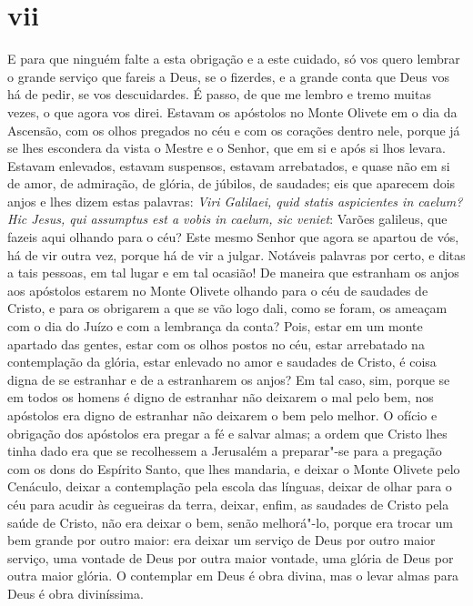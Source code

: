 \section*{vii}

E para que ninguém falte a esta obrigação e a este cuidado, só vos quero
lembrar o grande serviço que fareis a Deus, se o fizerdes, e a grande
conta que Deus vos há de pedir, se vos descuidardes. É passo, de que me
lembro e tremo muitas vezes, o que agora vos direi. Estavam os apóstolos
no Monte Olivete em o dia da Ascensão, com os olhos pregados no céu e
com os corações dentro nele, porque já se lhes escondera da vista o
Mestre e o Senhor, que em si e após
si lhos levara. Estavam enlevados, estavam suspensos, estavam
arrebatados, e quase não em si de amor, de admiração, de glória, de
júbilos, de saudades; eis que aparecem dois anjos e lhes dizem estas
palavras: \emph{Viri Galilaei, quid statis aspicientes in caelum? Hic
Jesus, qui assumptus est a vobis in caelum, sic veniet}: Varões
galileus, que fazeis aqui olhando para o céu? Este mesmo Senhor que
agora se apartou de vós, há de vir outra vez, porque há de vir a julgar.
Notáveis palavras por certo, e ditas a tais pessoas, em tal lugar e
em tal ocasião! De maneira que estranham os anjos aos apóstolos estarem
no Monte Olivete olhando para o céu de saudades de Cristo, e para os
obrigarem a que se vão logo dali, como se foram, os ameaçam com o
dia do Juízo e com a lembrança da conta? Pois, estar em um monte
apartado das gentes, estar com os olhos postos no céu, estar arrebatado
na contemplação da glória, estar enlevado no amor e saudades de Cristo,
é coisa digna de se estranhar e de a estranharem os anjos? Em tal caso,
sim, porque se em todos os homens é digno de estranhar não deixarem o
mal pelo bem, nos apóstolos era digno de estranhar não deixarem o bem
pelo melhor. O ofício e obrigação dos apóstolos era pregar a fé e salvar
almas; a ordem que Cristo lhes tinha dado era que se recolhessem a
Jerusalém a preparar"-se para a pregação com os dons do Espírito Santo,
que lhes mandaria, e deixar o Monte Olivete pelo Cenáculo, deixar a
contemplação pela escola das línguas, deixar de olhar para o céu para
acudir às cegueiras da terra, deixar, enfim, as saudades de Cristo pela
saúde de Cristo, não era deixar o bem, senão melhorá"-lo, porque era
trocar um bem grande por outro maior: era deixar um serviço de Deus por
outro maior serviço, uma vontade de Deus por outra maior vontade, uma
glória de Deus por outra maior glória. O contemplar em Deus é obra
divina, mas o levar almas para Deus é obra diviníssima.
